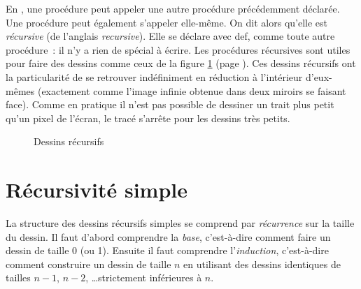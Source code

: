 En \python, une procédure peut appeler une autre procédure précédemment 
déclarée. Une procédure peut également s'appeler elle-même. On dit
alors qu'elle est {\em récursive} (de l'anglais {\em recursive}). Elle se déclare
avec {\mcl def}, comme toute autre procédure~: il n'y a rien de spécial à écrire. Les procédures récursives sont utiles
pour faire des dessins comme ceux de la figure \ref{fig:desrec} (page
\pageref{fig:desrec}). Ces dessins récursifs ont la particularité de se
retrouver indéfiniment en réduction à l'intérieur d'eux-mêmes (exactement
comme l'image infinie obtenue dans deux miroirs se faisant face). Comme en pratique il n'est 
pas possible de dessiner un trait plus petit qu'un pixel de l'écran, le tracé s'arrête 
pour les dessins très petits.
\begin{figure}[htbp]
 \caption{Dessins récursifs}\label{fig:desrec}
\end{figure}

\section{Récursivité simple}

La structure des dessins récursifs simples se comprend par {\em récurrence} sur la taille du dessin.
Il faut d'abord comprendre la {\em base\/}, c'est-à-dire comment faire un dessin de taille 0 (ou 1). 
Ensuite il faut comprendre l'{\em induction\/}, c'est-à-dire 
comment construire un dessin de taille $n$ en utilisant des dessins identiques de tailles $n-1$, 
$n-2$, \ldots strictement inférieures à $n$.  

